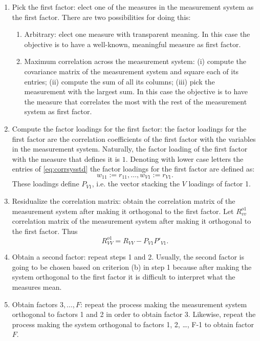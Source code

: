 \begin{enumerate}
\item Pick the first factor: elect one of the measures in the measurement system as the first factor. There are two possibilities for doing this:
\begin{enumerate}
\item Arbitrary: elect one measure with transparent meaning. In this case the objective is to have a well-known, meaningful measure as first factor.
\item Maximum correlation across the measurement system: (i) compute the covariance matrix of the measurement system and square each of its entries; (ii) compute the sum of all its columns; (iii) pick the measurement with the largest sum.  In this case the objective is to have the measure that correlates the most with the rest of the measurement system as first factor.
\end{enumerate}
\item Compute the factor loadings for the first factor: the factor loadings for the first factor are the correlation coefficients of the first factor with the variables in the measurement system. Naturally, the factor loading of the first factor with the measure that defines it is $1$. Denoting with lower case letters the entries of \eqref{eq:corrsysstd} the factor loadings for the first factor are defined as:
\begin{equation}
w_{11} := r_{11}, \ldots, w_{V1} := r_{V1}. 
\end{equation}
\noindent These loadings define $P_{V1}$, i.e. the vector stacking the $V$ loadings of factor 1.
\item Residualize the correlation matrix: obtain the correlation matrix of the measurement system after making it orthogonal to the first factor. Let $R_{vv}^{o1}$ correlation matrix of the measurement system after making it orthogonal to the first factor. Thus
\begin{equation}
R_{VV}^{o1} = R_{VV} - P_{V1} P'_{V1}. 
\end{equation}
\item Obtain a second factor: repeat steps 1 and 2. Usually, the second factor is going to be chosen based on criterion (b) in step 1 because after making the system orthogonal to the first factor it is difficult to interpret what the measures mean. 
\item Obtain factors $3, \ldots, F$: repeat the process making the measurement system orthogonal to factors 1 and 2 in order to obtain factor 3. Likewise, repeat the process making the system orthogonal to factors 1, 2, \ldots, F-1 to obtain factor $F$.  
\end{enumerate}

